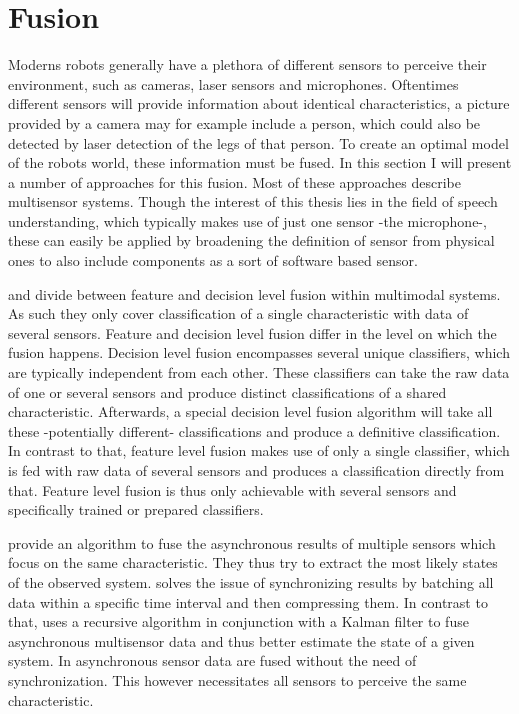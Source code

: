 
\section{Fusion}
\label{related:fusion}
Moderns robots generally have a plethora of different sensors to perceive their environment, such as cameras, laser sensors and microphones.
Oftentimes different sensors will provide information about identical characteristics, a picture provided by a camera may for example include a person, which could also be detected by laser detection of the legs of that person.
To create an optimal model of the robots world, these information must be fused.
In this section I will present a number of approaches for this fusion.
Most of these approaches describe multisensor systems.
Though the interest of this thesis lies in the field of speech understanding, which typically makes use of just one sensor -the microphone-, these can easily be applied by broadening the definition of sensor from physical ones to also include components as a sort of software based sensor.

\cite{TURK2014189} and \cite{PORIA201650} divide between feature and decision level fusion within multimodal systems.
As such they only cover classification of a single characteristic with data of several sensors.
Feature and decision level fusion differ in the level on which the fusion happens.
Decision level fusion encompasses several unique classifiers, which are typically independent from each other. 
These classifiers can take the raw data of one or several sensors and produce distinct classifications of a shared characteristic.
Afterwards, a special decision level fusion algorithm will take all these -potentially different- classifications and produce a definitive classification.
In contrast to that, feature level fusion makes use of only a single classifier, which is fed with raw data of several sensors and produces a classification directly from that.
Feature level fusion is thus only achievable with several sensors and specifically trained or prepared classifiers.

\cite{287895} provide an algorithm to fuse the asynchronous results of multiple sensors which focus on the same characteristic.
They thus try to extract the most likely states of the observed system.
\cite{10.1117/12.138164} solves the issue of synchronizing results by batching all data within a specific time interval and then compressing them. 
In contrast to that, \cite{4383603} uses a recursive algorithm in conjunction with a Kalman filter to fuse asynchronous multisensor data and thus better estimate the state of a given system.
In \cite{1468761} asynchronous sensor data are fused without the need of synchronization.
This however necessitates all sensors to perceive the same characteristic.